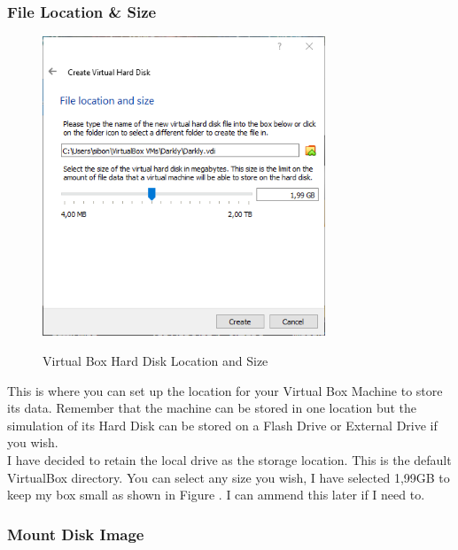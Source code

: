\subsubsection{File Location \& Size}
\begin{figure}[!htb]
    \centering
    \includegraphics[width=0.752\textwidth]{images/Win00-06.png}\\[0cm]  
    \caption[Windows Virtual Box]{Virtual Box Hard Disk Location and Size}
    \label{fig:00-06 - Windows Virtual Box Hard Disk} 
\end{figure}
This is where you can set up the location for your Virtual Box Machine to
store its data. Remember that the machine can be stored in one location but
the simulation of its Hard Disk can be stored on a Flash Drive or External
Drive if you wish.\\

I have decided to retain the local drive as the storage location. This is 
the default VirtualBox directory. You can select any size you wish, I have
selected 1,99GB to keep my box small as shown in Figure .
I can ammend this later if I need to.

\subsubsection{Mount Disk Image}

